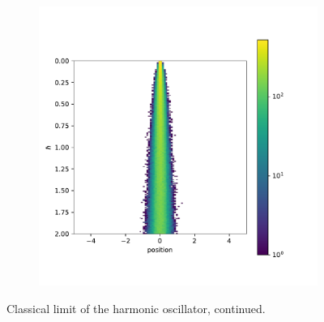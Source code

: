 \documentclass{scrartcl}
\begin{document}
\begin{figure}[H]
\begin{subfigure}[c]{0.32\textwidth}
				\label{fig:harmonic_oscillator_10_classical_limit_continued}
			\end{subfigure}
			\begin{subfigure}[c]{0.32\textwidth}
				\includegraphics[width=\textwidth]{../imgs/harmonic_oscillator_classical_limit/harmonic_oscillator_100_classical_limit.pdf}
				\label{fig:harmonic_oscillator_100_classical_limit_continued}
			\end{subfigure}
		\caption{Classical limit of the harmonic oscillator, continued.}
		\label{fig:harmonic_oscillator_classical_limit_continued}
	\end{figure}
\end{document}
